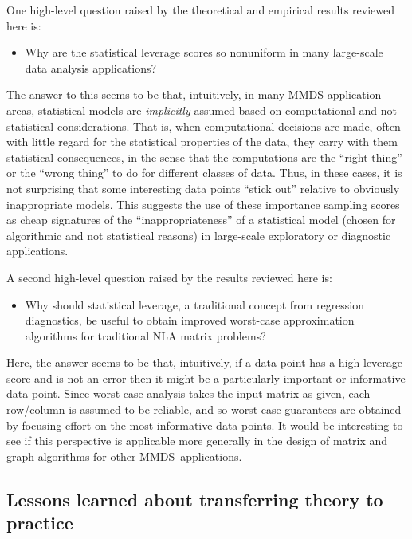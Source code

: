 \documentclass[twoside]{article}
\begin{document}
One high-level question raised by the theoretical and empirical results 
reviewed here is: 
\begin{itemize}
\item
Why are the statistical leverage scores 
so nonuniform in many large-scale data analysis applications?
\end{itemize}
The answer to this seems to be that, intuitively, in many MMDS application 
areas, statistical models are \emph{implicitly} assumed based on 
computational and not statistical considerations.
That is, when computational decisions are made, often with little regard 
for the statistical properties of the data, they carry with them statistical 
consequences, in the sense that the computations are the ``right thing'' or 
the ``wrong thing'' to do for different classes of data.
Thus, in these cases, it is not surprising that some interesting data points 
``stick out'' relative to obviously inappropriate models.
This suggests the use of these importance sampling scores as cheap 
signatures of the ``inappropriateness'' of a statistical model (chosen for 
algorithmic and not statistical reasons) in large-scale exploratory or
diagnostic applications.


A second high-level question raised by the results reviewed here is: 
\begin{itemize}
\item
Why should statistical leverage, a traditional concept 
from regression diagnostics, be useful to obtain improved worst-case 
approximation algorithms for traditional NLA matrix problems?
\end{itemize}
Here, the answer seems to be that, 
intuitively, if a data point has a high 
leverage score and is not an error then it might be a particularly 
important or informative data point.  
Since worst-case analysis takes the input matrix as given, each row/column 
is assumed to be reliable, and so worst-case guarantees are obtained by 
focusing effort on the most informative data points.
It would be interesting to see if this perspective is applicable more 
generally in the design of matrix and graph algorithms for other 
MMDS~applications.

\subsection{Lessons learned about transferring theory to practice}
\end{document}
